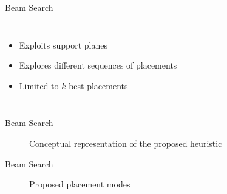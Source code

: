 \documentclass{beamer}
\begin{document}
    \begin{frame}{Beam Search}
        \begin{columns}[onlytextwidth,T]
        \column{\dimexpr\linewidth-75mm-5mm}
        \begin{itemize}
            \item Exploits support planes
            \item Explores different sequences of placements
            \item Limited to $k$ best placements
        \end{itemize}
        \column{75mm}
            \begin{figure}[h]
                \resizebox*{\columnwidth}{!}{%
                
                }
            \end{figure}
        \end{columns}
    \end{frame}
    \begin{frame}{Beam Search}
        \begin{figure}[h]
            \resizebox*{!}{.7\textheight}{%
            
            }
            \caption{Conceptual representation of the proposed heuristic}
        \end{figure}
    \end{frame}
    \begin{frame}{Beam Search}
        \begin{figure}[h]
            \resizebox*{!}{.65\textheight}{%
            
            }
            \caption{Proposed placement modes}
        \end{figure}
    \end{frame}
\end{document}

